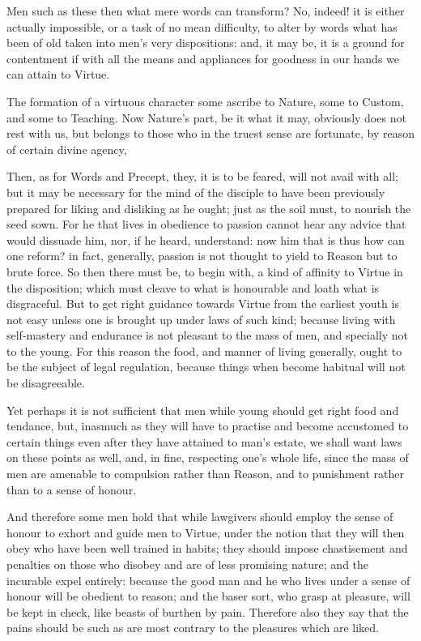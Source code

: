 Men such as these then what mere words can transform? No, indeed! it is either
actually impossible, or a task of no mean difficulty, to alter by words what
has been of old taken into men’s very dispositions: and, it may be, it is
a ground for contentment if with all the means and appliances for goodness in
our hands we can attain to Virtue.

The formation of a virtuous character some ascribe to Nature, some to Custom,
and some to Teaching. Now Nature’s part, be it what it may, obviously
does not rest with us, but belongs to those who in the truest sense are
fortunate, by reason of certain divine agency,

Then, as for Words and Precept, they, it is to be feared, will not avail with
all; but it may be necessary for the mind of the disciple to have been
previously prepared for liking and disliking as he ought; just as the soil
must, to nourish the seed sown. For he that lives in obedience to passion
cannot hear any advice that would dissuade him, nor, if he heard, understand:
now him that is thus how can one reform? in fact, generally, passion is not
thought to yield to Reason but to brute force. So then there must be, to begin
with, a kind of affinity to Virtue in the disposition; which must cleave to
what is honourable and loath what is disgraceful. But to get right guidance
towards Virtue from the earliest youth is not easy unless one is brought up
under laws of such kind; because living with self-mastery and endurance is not
pleasant to the mass of men, and specially not to the young. For this reason
the food, and manner of living generally, ought to be the subject of legal
regulation, because things when become habitual will not be disagreeable.

Yet perhaps it is not sufficient that men while young should get right food and
tendance, but, inasmuch as they will have to practise and become accustomed to
certain things even after they have attained to man’s estate, we shall
want laws on these points as well, and, in fine, respecting one’s whole
life, since the mass of men are amenable to compulsion rather than Reason, and
to punishment rather than to a sense of honour.

And therefore some men hold that while lawgivers should employ the sense of
honour to exhort and guide men to Virtue, under the notion that they will then
obey who have been well trained in habits; they should impose chastisement and
penalties on those who disobey and are of less promising nature; and the
incurable expel entirely: because the good man and he who lives under a sense
of honour will be obedient to reason; and the baser sort, who grasp at
pleasure, will be kept in check, like beasts of burthen by pain. Therefore also
they say that the pains should be such as are most contrary to the pleasures
which are liked.

